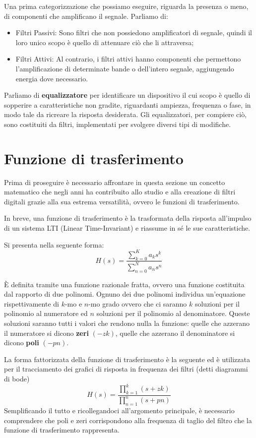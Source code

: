 Una prima categorizzazione che possiamo eseguire, riguarda la presenza o meno, di componenti che amplificano il segnale. Parliamo di:
\begin{itemize}
\item Filtri Passivi:
Sono filtri che non possiedono amplificatori di segnale, quindi il loro unico scopo è quello di attenuare ciò che li attraversa;
\item Filtri Attivi:
Al contrario, i filtri attivi hanno componenti che permettono l’amplificazione di determinate bande o dell’intero segnale, aggiungendo energia dove necessario.
\end{itemize}

Parliamo di \textbf{equalizzatore} per identificare un dispositivo il cui scopo è quello di sopperire a caratteristiche non gradite, riguardanti ampiezza, frequenza o fase, in modo tale da ricreare la risposta desiderata. Gli equalizzatori, per compiere ciò, sono costituiti da filtri, implementati per svolgere diversi tipi di modifiche.

\section{Funzione di trasferimento}
Prima di proseguire è necessario affrontare in questa sezione un concetto matematico che negli anni ha contribuito allo studio e alla creazione di filtri digitali grazie alla sua estrema versatilità, ovvero le funzioni di trasferimento.
 
In breve, una funzione di trasferimento è la trasformata della risposta all’impulso di un sistema LTI (Linear Time-Invariant) e riassume in sé le sue caratteristiche.

Si presenta nella seguente forma:
\begin{equation}
H(s)=\frac{\sum_{k=0}^K a_k s^k}{\sum_{n=0}^N a_n s^n}
\end{equation}

È definita tramite una funzione razionale fratta, ovvero una funzione costituita dal rapporto di due polinomi. Ognuno dei due polinomi individua un’equazione rispettivamente di $k$-mo e $n$-mo grado ovvero che ci saranno $k$ soluzioni per il polinomio al numeratore ed $n$ soluzioni per il polinomio al denominatore. Queste soluzioni saranno tutti i valori che rendono nulla la funzione: quelle che azzerano il numeratore si dicono \textbf{zeri} $(-zk)$, quelle che azzerano il denominatore si dicono \textbf{poli} $(-pn)$.

La forma fattorizzata della funzione di trasferimento è la seguente ed è utilizzata per il tracciamento dei grafici di risposta in frequenza dei filtri (detti diagrammi di bode)
\begin{equation}
H(s)=\frac{\prod_{k=1}^k (s+zk)}{\prod_{n=1}^n (s+pn)}
\end{equation}
\bigskip 
Semplificando il tutto e ricollegandoci all’argomento principale, è necessario comprendere che poli e zeri corrispondono alla frequenza di taglio del filtro che la funzione di trasferimento rappresenta.
